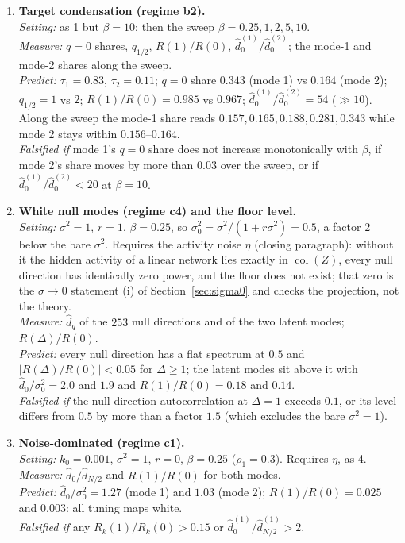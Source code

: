 \documentclass[11pt,a4paper]{article}
\newcommand{\col}{\operatorname{col}}
\theoremstyle{remark}
\begin{document}
\begin{enumerate}[leftmargin=2em,itemsep=4pt]
  \item \textbf{Target condensation (regime b2).}\\
  \emph{Setting:} as 1 but $\beta = 10$; then the sweep $\beta = 0.25, 1, 2, 5, 10$.\\
  \emph{Measure:} $q = 0$ shares, $q_{1/2}$, $R(1)/R(0)$, $\hat d_0^{(1)}/\hat d_0^{(2)}$; the mode-1 and mode-2 shares along the sweep.\\
  \emph{Predict:} $\tau_1 = 0.83$, $\tau_2 = 0.11$; $q = 0$ share $0.343$ (mode 1) vs $0.164$ (mode 2); $q_{1/2} = 1$ vs $2$; $R(1)/R(0) = 0.985$ vs $0.967$; $\hat d_0^{(1)}/\hat d_0^{(2)} = 54$ ($\gg10$). Along the sweep the mode-1 share reads $0.157, 0.165, 0.188, 0.281, 0.343$ while mode 2 stays within $0.156$--$0.164$.\\
  \emph{Falsified if} mode 1's $q = 0$ share does not increase monotonically with $\beta$, if mode 2's share moves by more than $0.03$ over the sweep, or if $\hat d_0^{(1)}/\hat d_0^{(2)} < 20$ at $\beta = 10$.

  \item \textbf{White null modes (regime c4) and the floor level.}\\
  \emph{Setting:} $\sigma^2 = 1$, $r = 1$, $\beta = 0.25$, so $\sigma_0^2 = \sigma^2/(1+r\sigma^2) = 0.5$, a factor $2$ below the bare $\sigma^2$. Requires the activity noise $\eta$ (closing paragraph): without it the hidden activity of a linear network lies exactly in $\col(Z)$, every null direction has identically zero power, and the floor does not exist; that zero is the $\sigma\to0$ statement (i) of Section~\ref{sec:sigma0} and checks the projection, not the theory.\\
  \emph{Measure:} $\hat d_q$ of the $253$ null directions and of the two latent modes; $R(\Delta)/R(0)$.\\
  \emph{Predict:} every null direction has a flat spectrum at $0.5$ and $|R(\Delta)/R(0)|<0.05$ for $\Delta\ge1$; the latent modes sit above it with $\hat d_0/\sigma_0^2 = 2.0$ and $1.9$ and $R(1)/R(0) = 0.18$ and $0.14$.\\
  \emph{Falsified if} the null-direction autocorrelation at $\Delta = 1$ exceeds $0.1$, or its level differs from $0.5$ by more than a factor $1.5$ (which excludes the bare $\sigma^2 = 1$).

  \item \textbf{Noise-dominated (regime c1).}\\
  \emph{Setting:} $k_0 = 0.001$, $\sigma^2 = 1$, $r = 0$, $\beta = 0.25$ ($\rho_1 = 0.3$). Requires $\eta$, as 4.\\
  \emph{Measure:} $\hat d_0/\hat d_{N/2}$ and $R(1)/R(0)$ for both modes.\\
  \emph{Predict:} $\hat d_0/\sigma_0^2 = 1.27$ (mode 1) and $1.03$ (mode 2); $R(1)/R(0) = 0.025$ and $0.003$: all tuning maps white.\\
  \emph{Falsified if} any $R_k(1)/R_k(0)>0.15$ or $\hat d_0^{(1)}/\hat d_{N/2}^{(1)}>2$.


\end{enumerate}
\end{document}
